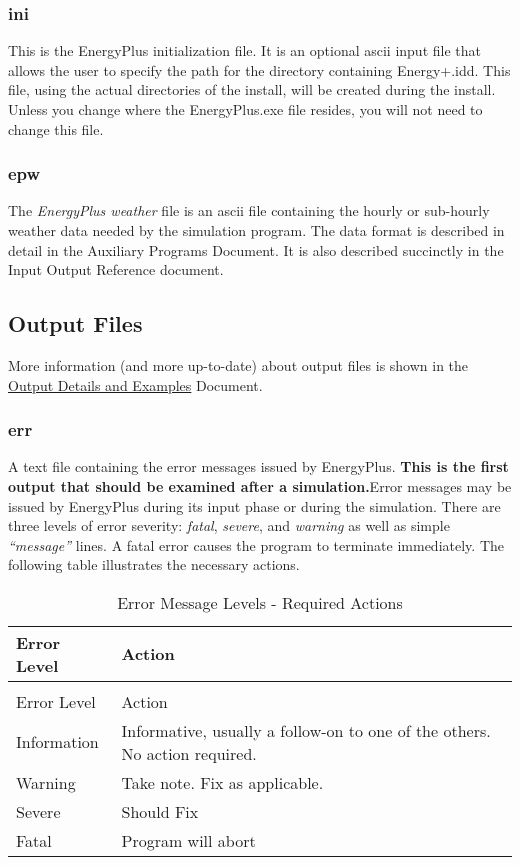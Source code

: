 \subsubsection{ini}\label{ini}

This is the EnergyPlus initialization file. It is an optional ascii input file that allows the user to specify the path for the directory containing Energy+.idd. This file, using the actual directories of the install, will be created during the install. Unless you change where the EnergyPlus.exe file resides, you will not need to change this file.

\subsubsection{epw}\label{epw}

The \emph{EnergyPlus weather} file is an ascii file containing the hourly or sub-hourly weather data needed by the simulation program. The data format is described in detail in the Auxiliary Programs Document. It is also described succinctly in the Input Output Reference document.

\subsection{Output Files}\label{output-files}

More information (and more up-to-date) about output files is shown in the \href{OutputDetailsAndExamples.pdf}{Output Details and Examples} Document.

\subsubsection{err}\label{err}

A text file containing the error messages issued by EnergyPlus. \textbf{This is the first output that should be examined after a simulation.}Error messages may be issued by EnergyPlus during its input phase or during the simulation. There are three levels of error severity: \emph{fatal}, \emph{severe}, and \emph{warning} as well as simple \emph{``message''} lines. A fatal error causes the program to terminate immediately. The following table illustrates the necessary actions.

\begin{longtable}[c]{p{1.5in}p{4.5in}}
\caption{Error Message Levels - Required Actions \label{table:error-message-levels-required-actions}} \tabularnewline
\toprule 
Error Level & Action \tabularnewline
\midrule
\endfirsthead

\caption[]{Error Message Levels - Required Actions} \tabularnewline
\toprule 
Error Level & Action \tabularnewline
\midrule
\endhead

Information & Informative, usually a follow-on to one of the others. No action required. \tabularnewline
Warning & Take note. Fix as applicable. \tabularnewline
Severe & Should Fix \tabularnewline
Fatal & Program will abort \tabularnewline
\bottomrule
\end{longtable}

